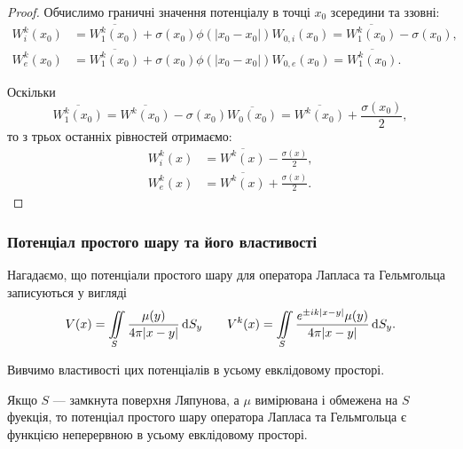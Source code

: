 \begin{proof}
	Обчислимо граничні значення потенціалу в точці $x_0$ зсередини та ззовні:
	\begin{align}
		W_{i}^k(x_0) &= \overline{W_1^k(x_0)} + \sigma(x_0) \phi(|x_0 - x_0|) W_{0,i}(x_0) = \overline{W_1^k(x_0)} - \sigma(x_0), \\
		W_{e}^k(x_0) &= \overline{W_1^k(x_0)} + \sigma(x_0) \phi(|x_0 - x_0|) W_{0,e}(x_0) = \overline{W_1^k(x_0)}.
	\end{align}

	Оскільки
	\begin{equation}
		\overline{W_1^k(x_0)} = \overline{W^k(x_0)} - \sigma(x_0) \overline{W_0(x_0)} = \overline{W^k(x_0)} + \frac{\sigma(x_0)}{2},
	\end{equation}
	то з трьох останніх рівностей отримаємо:
	\begin{align}
		W_{i}^k(x) &= \overline{W^k(x)} - \frac{\sigma(x)}{2}, \\
		W_{e}^k(x) &= \overline{W^k(x)} + \frac{\sigma(x)}{2}.
	\end{align}
\end{proof}

\subsubsection{Потенціал простого шару та його властивості}

Нагадаємо, що потенціали простого шару для оператора Лапласа та Гельмгольца записуються у вигляді 
\begin{equation}
	V(x) = \displaystyle\iint\limits_S \frac{\mu(y)}{4 \pi |x - y|} \mathop{}\!\mathrm{d} S_y \qquad V^k(x) = \displaystyle\iint\limits_S \frac{e^{\pm i k |x - y|} \mu(y)}{4 \pi |x - y|} \mathop{}\!\mathrm{d} S_y.
\end{equation}

Вивчимо властивості цих потенціалів в усьому евклідовому просторі.

\begin{theorem}
	Якщо $S$ --- замкнута поверхня Ляпунова, а $\mu$ вимірювана і обмежена на $S$ фуекція, то потенціал простого шару оператора Лапласа та Гельмгольца є функцією неперервною в усьому евклідовому просторі.
\end{theorem}


